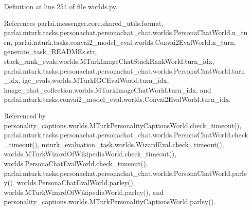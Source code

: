 Definition at line 254 of file worlds.\+py.



References parlai.\+messenger.\+core.\+shared\+\_\+utils.\+format, parlai.\+mturk.\+tasks.\+personachat.\+personachat\+\_\+chat.\+worlds.\+Persona\+Chat\+World.\+n\+\_\+turn, parlai.\+mturk.\+tasks.\+convai2\+\_\+model\+\_\+eval.\+worlds.\+Convai2\+Eval\+World.\+n\+\_\+turn, generate\+\_\+task\+\_\+\+R\+E\+A\+D\+M\+Es.\+str, stack\+\_\+rank\+\_\+evals.\+worlds.\+M\+Turk\+Image\+Chat\+Stack\+Rank\+World.\+turn\+\_\+idx, parlai.\+mturk.\+tasks.\+personachat.\+personachat\+\_\+chat.\+worlds.\+Persona\+Chat\+World.\+turn\+\_\+idx, igc\+\_\+evals.\+worlds.\+M\+Turk\+I\+G\+C\+Eval\+World.\+turn\+\_\+idx, image\+\_\+chat\+\_\+collection.\+worlds.\+M\+Turk\+Image\+Chat\+World.\+turn\+\_\+idx, and parlai.\+mturk.\+tasks.\+convai2\+\_\+model\+\_\+eval.\+worlds.\+Convai2\+Eval\+World.\+turn\+\_\+idx.



Referenced by personality\+\_\+captions.\+worlds.\+M\+Turk\+Personality\+Captions\+World.\+check\+\_\+timeout(), parlai.\+mturk.\+tasks.\+personachat.\+personachat\+\_\+chat.\+worlds.\+Persona\+Chat\+World.\+check\+\_\+timeout(), mturk\+\_\+evaluation\+\_\+task.\+worlds.\+Wizard\+Eval.\+check\+\_\+timeout(), worlds.\+M\+Turk\+Wizard\+Of\+Wikipedia\+World.\+check\+\_\+timeout(), worlds.\+Persona\+Chat\+Eval\+World.\+check\+\_\+timeout(), parlai.\+mturk.\+tasks.\+personachat.\+personachat\+\_\+chat.\+worlds.\+Persona\+Chat\+World.\+parley(), worlds.\+Persona\+Chat\+Eval\+World.\+parley(), worlds.\+M\+Turk\+Wizard\+Of\+Wikipedia\+World.\+parley(), and personality\+\_\+captions.\+worlds.\+M\+Turk\+Personality\+Captions\+World.\+parley().

